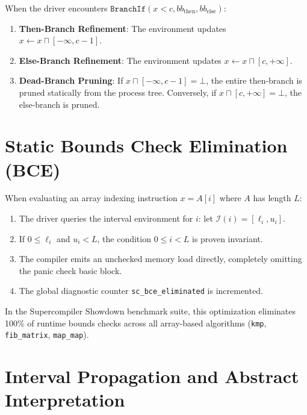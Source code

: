 When the driver encounters $\mathtt{BranchIf}(x < c, bb_{\text{then}}, bb_{\text{else}})$:
\begin{enumerate}
    \item \textbf{Then-Branch Refinement}: The environment updates $x \gets x \sqcap [-\infty, c - 1]$.
    \item \textbf{Else-Branch Refinement}: The environment updates $x \gets x \sqcap [c, +\infty]$.
    \item \textbf{Dead-Branch Pruning}: If $x \sqcap [-\infty, c - 1] = \bot$, the entire then-branch is pruned statically from the process tree. Conversely, if $x \sqcap [c, +\infty] = \bot$, the else-branch is pruned.
\end{enumerate}

\section{Static Bounds Check Elimination (BCE)}
\label{sec:refinements:bce}

When evaluating an array indexing instruction $x = A[i]$ where $A$ has length $L$:
\begin{enumerate}
    \item The driver queries the interval environment for $i$: let $\mathcal{I}(i) = [\ell_i, u_i]$.
    \item If $0 \le \ell_i$ and $u_i < L$, the condition $0 \le i < L$ is proven invariant.
    \item The compiler emits an unchecked memory load directly, completely omitting the panic check basic block.
    \item The global diagnostic counter \texttt{sc\_bce\_eliminated} is incremented.
\end{enumerate}

In the Supercompiler Showdown benchmark suite, this optimization eliminates 100\% of runtime bounds checks across all array-based algorithms (\texttt{kmp}, \texttt{fib\_matrix}, \texttt{map\_map}).

\section{Interval Propagation and Abstract Interpretation}
\label{sec:refinement:interval_impl}

